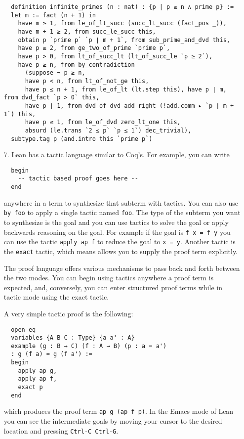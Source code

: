 \documentclass[12pt]{amsart}  %
\begin{document}
\begin{enumerate}
\begin{lstlisting}
  definition infinite_primes (n : nat) : {p | p ≥ n ∧ prime p} :=
  let m := fact (n + 1) in
    have m ≥ 1, from le_of_lt_succ (succ_lt_succ (fact_pos _)),
    have m + 1 ≥ 2, from succ_le_succ this,
    obtain p `prime p` `p ∣ m + 1`, from sub_prime_and_dvd this,
    have p ≥ 2, from ge_two_of_prime `prime p`,
    have p > 0, from lt_of_succ_lt (lt_of_succ_le `p ≥ 2`),
    have p ≥ n, from by_contradiction
      (suppose ¬ p ≥ n,
      have p < n, from lt_of_not_ge this,
      have p ≤ n + 1, from le_of_lt (lt.step this), have p ∣ m, from dvd_fact `p > 0` this,
      have p ∣ 1, from dvd_of_dvd_add_right (!add.comm ▸ `p ∣ m + 1`) this,
      have p ≤ 1, from le_of_dvd zero_lt_one this,
      absurd (le.trans `2 ≤ p` `p ≤ 1`) dec_trivial),
  subtype.tag p (and.intro this `prime p`)
\end{lstlisting}

\item[7.]  Lean has a tactic language similar to Coq's. For example, you can write
\begin{lstlisting}
  begin
    -- tactic based proof goes here -- 
  end
\end{lstlisting}
anywhere in a term to synthesize that subterm with tactics.
You can also use \lstinline{by foo} to apply a single tactic named \lstinline{foo}.
The type of the subterm you want to synthesize is the goal and you can use
tactics to solve the goal or apply backwards reasoning on the goal.
For example if the goal is \lstinline{f x = f y} you can use the tactic \lstinline{apply ap f} to reduce the goal to
\lstinline{x = y}. Another tactic is the \lstinline{exact} tactic, which means allows you to supply the proof term explicitly. 

The proof language offers various mechanisms to pass back and forth between the two modes.
You can begin using tactics anywhere a proof term is expected, and, conversely, you can enter
structured proof terms while in tactic mode using the exact tactic.

A very simple tactic proof is the following:
\begin{lstlisting}
  open eq
  variables {A B C : Type} {a a' : A}
  example (g : B → C) (f : A → B) (p : a = a')
  : g (f a) = g (f a') :=
  begin
    apply ap g,
    apply ap f,
    exact p
  end
\end{lstlisting}
which produces the proof term \lstinline{ap g (ap f p)}. In the Emacs mode of Lean you can see the
intermediate goals by moving your cursor to the desired location and pressing \lstinline{Ctrl-C Ctrl-G}.


\end{enumerate}
\end{document}
